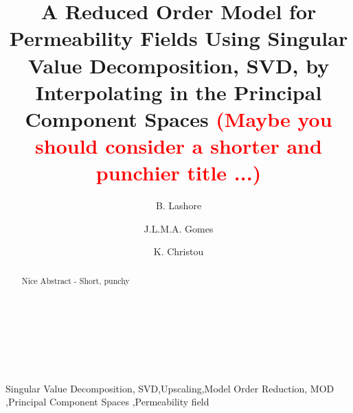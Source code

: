 \documentclass[preprint,12pt]{elsarticle}
\newcommand{\red}{\textcolor{red}}
\begin{document}
\begin{frontmatter}



\title{A Reduced Order Model for Permeability Fields Using Singular Value Decomposition, SVD, by Interpolating in the Principal Component Spaces \red{(Maybe you should consider a shorter and punchier title ...)}}
\author[UoA]{B. Lashore} \author[UoA]{J.L.M.A. Gomes} \author[UoA]{K. Christou}
\address[UoA]{Mechanics of Fluids, Soils \& Structures Research Group \\ School of Engineering University of Aberdeen, UK}


\begin{abstract}
Nice Abstract - Short, punchy
\\
\\
\\
\\
\\
\\ 
\end{abstract}



\begin{keyword} %
Singular Value Decomposition, SVD\sep Upscaling\sep Model Order Reduction, MOD \sep  Principal Component Spaces \sep Permeability field
\end{keyword}
 
\end{frontmatter}

\end{document}
